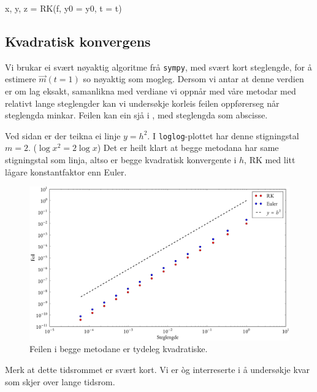 \documentclass[12pt]{article}
\begin{document}
\begin{multicols}{2}
\begin{minipage}{\linewidth}
\begin{python}[caption={Bruk av RK-løysarane},label=lst:solver]
x, y, z = RK(f, y0 = y0, t = t)
    \end{python}
    \end{minipage}


    \subsection{Kvadratisk konvergens}
    Vi brukar ei svært nøyaktig algoritme frå \verb|sympy|,
    med svært kort steglengde,
    for å estimere $\vec m(t = 1)$ so nøyaktig som mogleg.
    Dersom vi antar at denne verdien er om lag eksakt,
    samanlikna med verdiane vi oppnår med våre metodar med
    relativt lange steglengder kan vi undersøkje korleis
    feilen oppførerseg når steglengda minkar.
    Feilen kan ein sjå i , med steglengda som abscisse.

    Ved sidan er der teikna ei linje $y = h^2$.
    I \verb|loglog|-plottet har denne stigningstal $m = 2$.
    ($\log x^2 = 2 \log x$)
    Det er heilt klart at begge metodana har same stigningstal som linja,
    altso er begge kvadratisk konvergente i $h$,
    RK med litt lågare konstantfaktor enn Euler.
    \begin{figure}[H]
        \centering
        \includegraphics[width=\columnwidth]{kvad_err}
        \caption{
            Feilen i begge metodane er tydeleg kvadratiske.
        }
        \label{fig:kvad_err}
    \end{figure}
    \noindent Merk at dette tidsrommet er svært kort.
    Vi er \`og interreserte i å undersøkje kvar som skjer over
    lange tidsrom.

\end{multicols}
\end{document}
